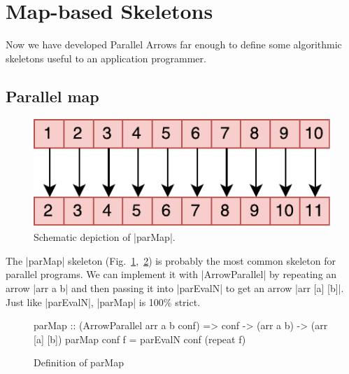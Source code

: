 
\section{Map-based Skeletons}
\label{sec:map-skeletons}
Now we have developed Parallel Arrows far enough to define some algorithmic skeletons useful to an application programmer.
\subsection{Parallel map}
\begin{figure}[h]
	\includegraphics[scale=0.7]{images/parMap}
	\caption{Schematic depiction of |parMap|.}
	\label{fig:parMapImg}
\end{figure}
The |parMap| skeleton (Fig.~\ref{fig:parMapImg},~\ref{fig:parMap}) is probably the most common skeleton for parallel programs. We can implement it with |ArrowParallel| by repeating an arrow |arr a b| and then passing it into |parEvalN| to get an arrow |arr [a] [b]|.
Just like |parEvalN|, |parMap| is 100\% strict.
\begin{figure}[h]
\begin{code}
parMap :: (ArrowParallel arr a b conf) => conf -> (arr a b) -> (arr [a] [b])
parMap conf f = parEvalN conf (repeat f)
\end{code}
\caption{Definition of parMap}
\label{fig:parMap}
\end{figure}

